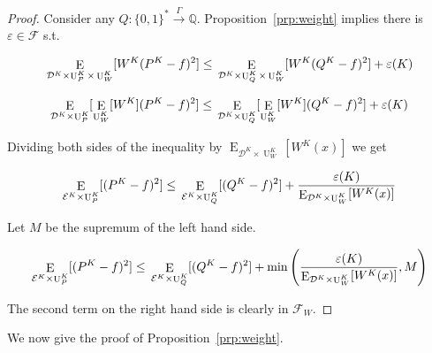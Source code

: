 \documentclass[11pt]{article}
\numberwithin{equation}{section}
\theoremstyle{definition}
\theoremstyle{plain}
\newcommand{\Bool}{\{0,1\}}
\newcommand{\Words}{{\Bool^*}}
\DeclareMathOperator{\E}{E}
\DeclareMathOperator{\Un}{U}
\newcommand{\Rats}{\mathbb{Q}}
\newcommand{\Dist}{\mathcal{D}}
\newcommand{\Fall}{\mathcal{F}}
\newcommand{\Scheme}{\xrightarrow{\Gamma}}
\begin{document}
\begin{proof}

Consider any $Q: \Words \Scheme \Rats$. Proposition~\ref{prp:weight} implies there is $\varepsilon \in \Fall$ s.t.

$$\E_{\Dist^{K} \times \Un_P^{K} \times \Un_W^{K}}[W^{K}(P^{K} - f)^2] \leq \\ \E_{\Dist^{K} \times \Un_Q^{K} \times \Un_W^{K}}[W^{K}(Q^{K} - f)^2] + \varepsilon(K)$$

$$\E_{\Dist^{K} \times \Un_P^{K}}[\E_{\Un_W^{K}}[W^{K}](P^{K} - f)^2] \leq \\ \E_{\Dist^{K} \times \Un_Q^{K}}[\E_{\Un_W^{K}}[W^{K}](Q^{K} - f)^2] + \varepsilon(K)$$

Dividing both sides of the inequality by $\E_{\Dist^{K} \times \Un_W^{K}}[W^{K}(x)]$ we get

$$\E_{\mathcal{E}^{K} \times \Un_P^{K}}[(P^{K} - f)^2] \leq \\ \E_{\mathcal{E}^{K} \times \Un_Q^{K}}[(Q^{K} - f)^2] + \frac{\varepsilon(K)}{\E_{\Dist^{K} \times \Un_W^{K}}[W^{K}(x)]}$$

Let $M$ be the supremum of the left hand side.

$$\E_{\mathcal{E}^{K} \times \Un_P^{K}}[(P^{K} - f)^2] \leq \\ \E_{\mathcal{E}^{K} \times \Un_Q^{K}}[(Q^{K} - f)^2] + \min\left(\frac{\varepsilon(K)}{\E_{\Dist^{K} \times \Un_W^{K}}[W^{K}(x)]},M\right)$$

The second term on the right hand side is clearly in $\Fall_W$.
\end{proof}

We now give the proof of Proposition~\ref{prp:weight}.
\end{document}

